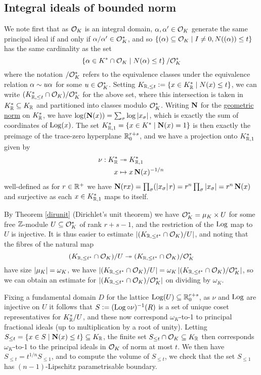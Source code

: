 \documentclass[11pt]{report}
\begin{document}
\subsection{Integral ideals of bounded norm}
We note first that as $\mathcal{O}_K$ is an integral domain, $\alpha, \alpha' \in \mathcal{O}_K$ generate the same principal ideal if and only if $\alpha/\alpha' \in \mathcal{O}_K^*$, and so $\left\{  (\alpha) \subseteq \mathcal{O}_K \mid I \neq 0, N((\alpha)) \leq t  \right\}$ has the same cardinality as the set 
$$
    \left\{  \alpha \in K^* \cap \mathcal{O}_K \mid N(\alpha) \leq t  \right\} / \mathcal{O}_K^*
$$
where the notation $/\mathcal{O}_K^*$ refers to the equivalence classes under the equivalence relation $\alpha \sim u\alpha$ for some $u \in \mathcal{O}_K^*$. Setting $K_{\mathbb{R}, \leq t} \vcentcolon= \left\{  x \in K_{\mathbb{R}}^* \mid N(x) \leq t  \right\}$, we can write $(K_{\mathbb{R}, \leq t}^* \cap \mathcal{O}_K) / \mathcal{O}_K^*$ for the above set, where this intersection is taken in $K_{\mathbb{R}}^* \subseteq K_{\mathbb{R}}$ and partitioned into classes modulo $\mathcal{O}_K^*$. Writing $\operatorname{\mathbf{N}}$ for the \hyperlink{geomnorm}{geometric norm} on $K_{\mathbb{R}}^*$, we have $\log(\operatorname{\mathbf{N}}(x)) = \sum_{\sigma} \log\left| x_\sigma \right|$, which is exactly the sum of coordinates of $\operatorname{Log}(x)$. The set $K_{\mathbb{R}, 1}^* = \left\{  x \in K^* \mid \operatorname{\mathbf{N}}(x) = 1  \right\}$ is then exactly the preimage of the trace-zero hyperplane $\mathbb{R}^{r + s}_0$, and we have a projection onto $K_{\mathbb{R}, 1}^*$ given by
\begin{align*}
    \nu : K_{\mathbb{R}}^* &\twoheadrightarrow K_{\mathbb{R}, 1}^* \\
    x &\mapsto x\operatorname{\mathbf{N}}(x)^{-1/n}
\end{align*}
well-defined as for $r \in \mathbb{R}^+$ we have $\operatorname{\mathbf{N}}(rx) = \prod_{\sigma} (\left| x_\sigma \right|r) = r^n\prod_{\sigma}\left| x_\sigma \right| = r^n\operatorname{\mathbf{N}}(x)$ and surjective as each $x \in K_{\mathbb{R}, 1}^*$ maps to itself.

By Theorem \ref{dirunit} (Dirichlet's unit theorem) we have $\mathcal{O}_K^* = \mu_K \times U$ for some free $\mathbb{Z}$-module $U \subseteq \mathcal{O}_K^*$ of rank $r + s - 1$, and the restriction of the $\operatorname{Log}$ map to $U$ is injective. It is thus easier to estimate $\left| (K_{\mathbb{R}, \leq t^*} \cap \mathcal{O}_K) / U \right|$, and noting that the fibres of the natural map 
$$
    (K_{\mathbb{R}, \leq t^*} \cap \mathcal{O}_K) / U \twoheadrightarrow (K_{\mathbb{R}, \leq t^*} \cap \mathcal{O}_K) / \mathcal{O}_K^*
$$
have size $\left| \mu_K \right| = \omega_K$, we have $\left| (K_{\mathbb{R}, \leq t^*} \cap \mathcal{O}_K) / U \right| = \omega_K\left| (K_{\mathbb{R}, \leq t^*} \cap \mathcal{O}_K) / \mathcal{O}_K^* \right|$, so we can obtain an estimate for $\left| (K_{\mathbb{R}, \leq t^*} \cap \mathcal{O}_K) / \mathcal{O}_K^* \right|$ on dividing by $\omega_K$. 

Fixing a fundamental domain $D$ for the lattice $\operatorname{Log}(U) \subseteq \mathbb{R}^{r + s}_0$, as $\nu$ and $\operatorname{Log}$ are injective on $U$ it follows that $S \vcentcolon= (\operatorname{Log} \circ \nu)^{-1}(R)$ is a set of unique coset representatives for $K_{\mathbb{R}}^* / U$,  and these now correspond $\omega_K$-to-1 to principal fractional ideals (up to multiplication by a root of unity). Letting $S_{\leq t} = \left\{  x \in S \mid \operatorname{\mathbf{N}}(x) \leq t  \right\} \subseteq K_{\mathbb{R}}$, the finite set $S_{\leq t} \cap \mathcal{O}_K \subseteq K_{\mathbb{R}}$ then corresponds $\omega_K$-to-1 to the principal ideals in $\mathcal{O}_K$ of norm at most $t$. We then have $S_{\leq t} = t^{1/n}S_{\leq 1}$, and to compute the volume of $S_{\leq t}$, we check that the set $S_{\leq 1}$ has $(n - 1)$-Lipschitz parametrisable boundary.
\end{document}
